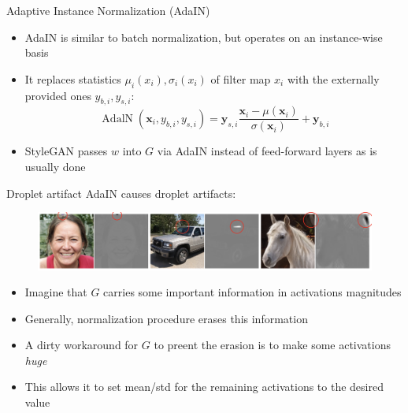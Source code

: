 \documentclass[handout, 10pt]{beamer}
\begin{document}
\begin{frame}{Adaptive Instance Normalization (AdaIN)}
\begin{itemize}
    \item\pause AdaIN is similar to batch normalization, but operates on an instance-wise basis
    \item\pause It replaces statistics $\mu_i(x_i), \sigma_i(x_i)$ of filter map $x_i$ with the externally provided ones $y_{b,i}, y_{s,i}$:
\begin{equation}
\operatorname{AdalN}\left(\mathbf{x}_{i}, y_{b,i}, y_{s,i}\right)=\mathbf{y}_{s, i} \frac{\mathbf{x}_{i}-\mu\left(\mathbf{x}_{i}\right)}{\sigma\left(\mathbf{x}_{i}\right)}+\mathbf{y}_{b, i}
\end{equation}
    \item\pause StyleGAN passes $w$ into $G$ via AdaIN instead of feed-forward layers as is usually done
\end{itemize}
\end{frame}


\begin{frame}{Droplet artifact}
AdaIN causes droplet artifacts:
\begin{figure}
\centering
\includegraphics[width=\textwidth]{images/droplet-artifact}
\end{figure}
\begin{itemize}
    \item\pause Imagine that $G$ carries some important information in activations magnitudes
    \item\pause Generally, normalization procedure erases this information
    \item\pause A dirty workaround for $G$ to preent the erasion is to make some activations \textit{huge}
    \item\pause This allows it to set mean/std for the remaining activations to the desired value
\end{itemize}
\end{frame}
\end{document}
